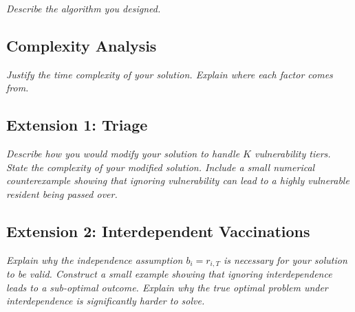 \documentclass[12pt,a4paper]{article}
\begin{document}
\textit{Describe the algorithm you designed.}

\subsection*{Complexity Analysis}

\textit{Justify the time complexity of your solution. Explain where each
factor comes from.}

\subsection*{Extension 1: Triage}

\textit{Describe how you would modify your solution to handle $K$
vulnerability tiers. State the complexity of your modified solution.
Include a small numerical counterexample showing that ignoring
vulnerability can lead to a highly vulnerable resident being passed
over.}

\subsection*{Extension 2: Interdependent Vaccinations}

\textit{Explain why the independence assumption $b_i = r_{i,T}$ is
necessary for your solution to be valid. Construct a small example showing
that ignoring interdependence leads to a sub-optimal outcome. Explain
why the true optimal problem under interdependence is significantly
harder to solve.}

\printbibliography
\end{document}
